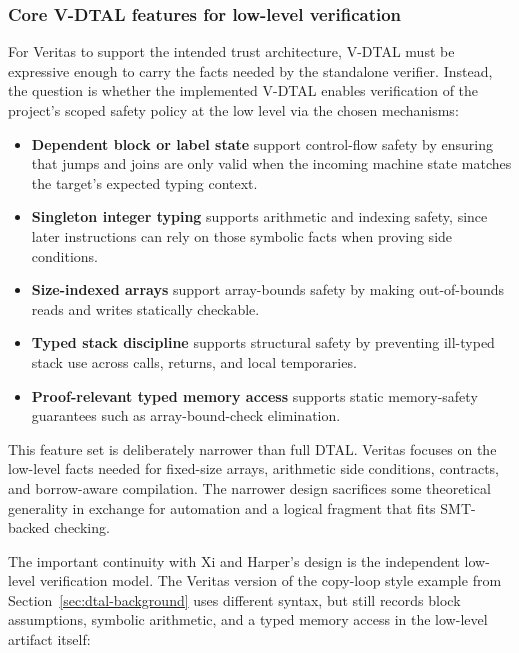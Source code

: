 
\subsubsection{Core V-DTAL features for low-level verification}

For Veritas to support the intended trust architecture, V-DTAL must be expressive enough to carry the facts needed by the standalone verifier. Instead, the question is whether the implemented V-DTAL enables verification of the project's scoped safety policy at the low level via the chosen mechanisms:
\begin{itemize}
  \item \textbf{Dependent block or label state} support control-flow safety by ensuring that jumps and joins are only valid when the incoming machine state matches the target's expected typing context.
  \item \textbf{Singleton integer typing} supports arithmetic and indexing safety, since later instructions can rely on those symbolic facts when proving side conditions.
  \item \textbf{Size-indexed arrays} support array-bounds safety by making out-of-bounds reads and writes statically checkable.
  \item \textbf{Typed stack discipline} supports structural safety by preventing ill-typed stack use across calls, returns, and local temporaries.
  \item \textbf{Proof-relevant typed memory access} supports static memory-safety guarantees such as array-bound-check elimination.
\end{itemize}

This feature set is deliberately narrower than full DTAL. Veritas focuses on the low-level facts needed for fixed-size arrays, arithmetic side conditions, contracts, and borrow-aware compilation. The narrower design sacrifices some theoretical generality in exchange for automation and a logical fragment that fits SMT-backed checking.

The important continuity with Xi and Harper's design is the independent low-level verification model. The Veritas version of the copy-loop style example from Section~\ref{sec:dtal-background} uses different syntax, but still records block assumptions, symbolic arithmetic, and a typed memory access in the low-level artifact itself:

